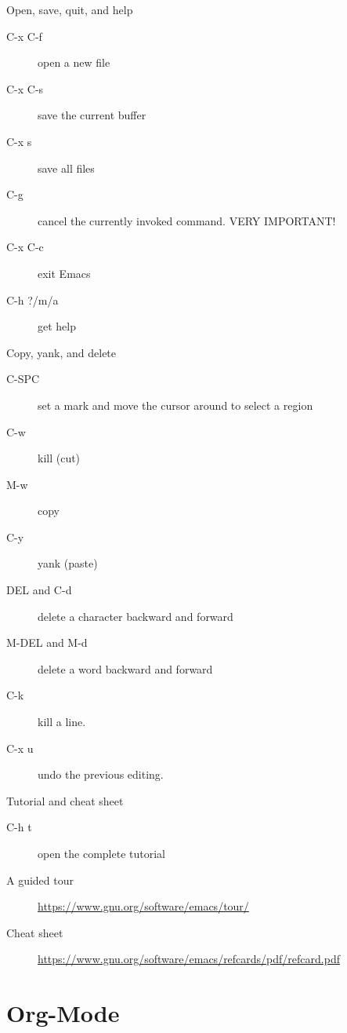 \documentclass[presentation]{beamer}
\begin{document}
\begin{frame}[label={sec:orge4cb53a}]{Open, save, quit, and help}
\begin{description}
\item[{C-x C-f}] open a new file
\item[{C-x C-s}] save the current buffer
\item[{C-x s}] save all files
\item[{C-g}] cancel the currently invoked command. VERY IMPORTANT!
\item[{C-x C-c}] exit Emacs
\item[{C-h ?/m/a}] get help
\end{description}
\end{frame}

\begin{frame}[label={sec:org096924d}]{Copy, yank, and delete}
\begin{description}
\item[{C-SPC}] set a mark and move the cursor around to select a region
\item[{C-w}] kill (cut)
\item[{M-w}] copy
\item[{C-y}] yank (paste)
\item[{DEL and C-d}] delete a character backward and forward
\item[{M-DEL and M-d}] delete a word backward and forward
\item[{C-k}] kill a line.
\item[{C-x u}] undo the previous editing.
\end{description}
\end{frame}

\begin{frame}[label={sec:org3dbac33}]{Tutorial and cheat sheet}
\begin{description}
\item[{C-h t}] open the complete tutorial

\item[{A guided tour}] \url{https://www.gnu.org/software/emacs/tour/}

\item[{Cheat sheet}] \url{https://www.gnu.org/software/emacs/refcards/pdf/refcard.pdf}
\end{description}
\end{frame}


\section{Org-Mode}
\label{sec:orgc754d2b}
\end{document}

